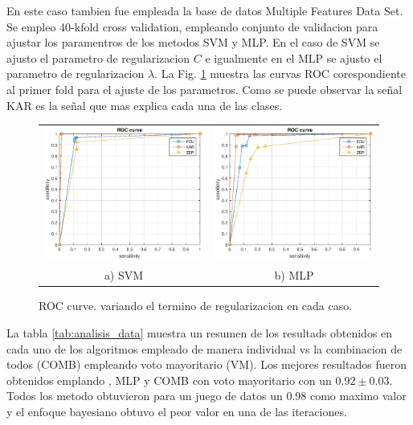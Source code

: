 \documentclass[12pt]{article}
\begin{document}
En este caso tambien fue empleada la base de datos Multiple Features Data Set. Se empleo 40-kfold cross validation, empleando conjunto de validacion para ajustar los paramentros de los metodos SVM y MLP. En el caso de SVM se ajusto el parametro de regularizacion $C$ e igualmente en el MLP se ajusto el parametro de regularizacion $\lambda$. La Fig. \ref{fig:roc_curve} muestra las curvas ROC corespondiente al primer fold para el ajuste de los parametros. Como se puede observar la señal KAR es la señal que mas explica cada una de las clases. 


\begin{figure}[!h]
\centering
\begin{tabular}{cc}
\includegraphics[width=2.5in]{../out/svm-roc.eps}&
\includegraphics[width=2.5in]{../out/mlp-roc.eps} \\
a) SVM  & b) MLP
\end{tabular}
\caption{ROC curve. variando el termino de regularizacion en cada caso.}
\label{fig:roc_curve}
\end{figure}
 
 
 
La tabla \ref{tab:analisis_data} muestra un resumen de los resultads obtenidos en cada uno de los algoritmos empleado de manera individual vs la combinacion de todos (COMB) empleando voto mayoritario (VM). Los mejores resultados fueron obtenidos emplando , MLP y COMB con voto mayoritario con un $0.92 \pm 0.03$. Todos los metodo obtuvieron para un juego de datos un 0.98 como maximo valor y el enfoque bayesiano obtuvo el peor valor en una de las iteraciones.
 
\end{document}
